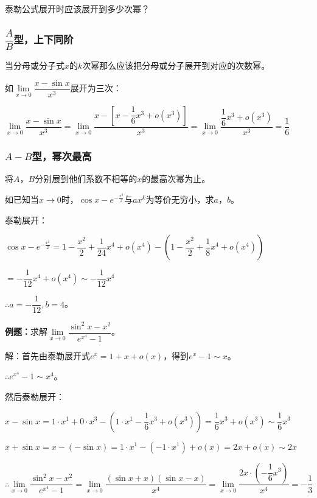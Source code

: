 \documentclass[UTF8, 12pt]{ctexart}
\begin{document}
        泰勒公式展开时应该展开到多少次幂？

        \subsubsection{\texorpdfstring{$\dfrac{A}{B}$}\ 型，上下同阶}

        当分母或分子式$x$的$k$次幂那么应该把分母或分子展开到对应的次数幂。\medskip

        如$\lim\limits_{x\to 0}\dfrac{x-\sin x}{x^3}$展开为三次：\medskip

        $\lim\limits_{x\to 0}\dfrac{x-\sin x}{x^3}=\lim\limits_{x\to 0}\dfrac{x-\left[x-\dfrac{1}{6}x^3+o(x^3)\right]}{x^3}=\lim\limits_{x\to 0}\dfrac{\dfrac{1}{6}x^3+o(x^3)}{x^3}=\dfrac{1}{6}$

        \subsubsection{\texorpdfstring{$A-B$}\ 型，幂次最高}

        将$A$，$B$分别展到他们系数不相等的$x$的最高次幂为止。

        如已知当$x\to 0$时，$\cos x-e^{-\frac{x^2}{2}}$与$ax^k$为等价无穷小，求$a$，$b$。

        泰勒展开：

        $\cos x-e^{-\frac{x^2}{2}}= 1-\dfrac{x^2}{2}+\dfrac{1}{24}x^4+o(x^4)-\left(1-\dfrac{x^2}{2}+\dfrac{1}{8}x^4+o(x^4)\right)$

        $=-\dfrac{1}{12}x^4+o(x^4)\sim -\dfrac{1}{12}x^4$

        $\therefore a=-\dfrac{1}{12},b=4$。

        \textbf{例题：}求解$\lim\limits_{x\to 0}\dfrac{\sin^2x-x^2}{e^{x^4}-1}$。

        解：首先由泰勒展开式$e^x=1+x+o(x)$，得到$e^x-1\sim x$。

        $\therefore e^{x^4}-1\sim x^4$。

        然后泰勒展开：

        $x-\sin x=1\cdot x^1+0\cdot x^3 - (1\cdot x^1-\dfrac{1}{6}x^3+o(x^3))= \dfrac{1}{6}x^3+o(x^3)\sim\dfrac{1}{6}x^3$

        $x+\sin x=x-(-\sin x)=1\cdot x^1-(-1\cdot x^1)+o(x)=2x+o(x)\sim 2x$ \medskip

        $\therefore\lim\limits_{x\to 0}\dfrac{\sin^2x-x^2}{e^{x^4}-1}=\lim\limits_{x\to 0}\dfrac{(\sin x+x)(\sin x-x)}{x^4}=\lim\limits_{x\to 0}\dfrac{2x\cdot\left(-\dfrac{1}{6}x^3\right)}{x^4}=-\dfrac{1}{3}$
\end{document}
